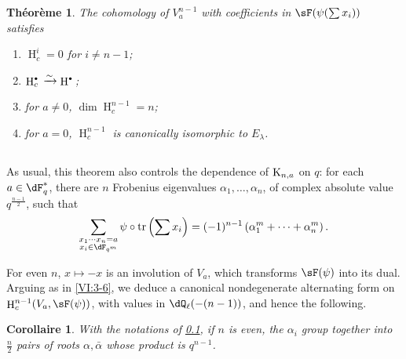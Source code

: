 \documentclass[oneside]{book}
\DeclareMathOperator{\h}{H}
\DeclareMathOperator{\tr}{tr}
\newcommand{\iso}{\xrightarrow\sim}
\newcommand{\kloos}{\textnormal{K}} %
\theoremstyle{sga-source}
\theoremstyle{sga-source-dash}
\theoremstyle{sga-source-dotdash}
\theoremstyle{sga-source-number-note-dash}
\theoremstyle{sga-source-note-number-dotdash}
\theoremstyle{sga-source-example-dotdash}
\theoremstyle{sga-source-inline-number}
\theoremstyle{sga-source-bare-number}
\theoremstyle{sga-source}
\newtheorem{corollary_}[subsection]{Corollaire}
\newtheorem{theorem_}[subsection]{Théorème}
\let\oldbullet\bullet
\renewcommand{\bullet}{\textnormal{\tiny$\oldbullet$}}
\newcommand{\PrintPage}[1]{}\newcommand{\MathPage}[1]{}\newcommand{\PrintCite}[2]{#1}\newcommand{\var}[3]{#2}
\begin{document}
\begin{theorem_}\label{VI:7-4}
The cohomology of $V_a^{n-1}$ with coefficients in $\sF(\psi(\sum x_i))$ satisfies 
\begin{enumerate}[\indent (i)]
  \item $\h_c^i=0$ for $i\ne n-1$; 
  \item $\h_c^\bullet{} \iso \h^\bullet{}$; 
  \item for $a\ne 0$, $\dim \h_c^{n-1}{}=n$; 
  \PrintPage{221}
\item for $a=0$, $\h_c^{n-1}{}$ is canonically isomorphic to $E_\lambda$. 
\end{enumerate}
\end{theorem_}





\subsection{}\label{VI:7-5}

As usual, this theorem also controls the dependence of 
$\kloos_{n,a}$ on $q$: for each $a\in \dF_q^\ast$, there are $n$ Frobenius 
eigenvalues $\alpha_1,\dots,\alpha_n$, of complex absolute value 
$q^{\frac{n-1}{2}}$, such that 
\[
  \sum_{\substack{x_1\dotsm x_n = a \\ x_i\in \dF_{q^m}}} \psi\circ \tr\left(\sum x_i\right) = (-1)^{n-1} \left(\alpha_1^m + \cdots + \alpha_n^m \right) \text{.} 
\]

For even $n$, $x\mapsto -x$ is an involution of $V_a$, which transforms 
$\sF(\psi)$ into its dual. Arguing as in \ref{VI:3-6}, we deduce a 
canonical nondegenerate alternating form on $\h_c^{n-1}(V_a,\sF(\psi))$, 
with values in $\dQ_\ell(-(n-1))$, and hence the following. 





\begin{corollary_}\label{VI:7-6}
With the notations of \ref{VI:7-5}, if $n$ is even, the $\alpha_i$ group together 
into $\frac n 2$ pairs of roots $\alpha,\bar\alpha$ whose product is 
$q^{n-1}$. 
\end{corollary_}





\subsection{}\label{VI:7-7}
\end{document}
